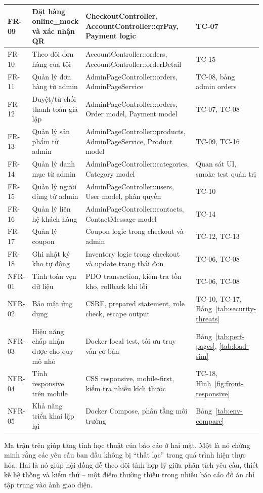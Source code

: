 \documentclass[11pt, a4paper]{article}
\begin{document}
\begin{longtable}{|p{1.2cm}|p{4.2cm}|p{3.6cm}|p{3.6cm}|}
    FR-09 & Đặt hàng online\_mock và xác nhận QR & CheckoutController, AccountController::qrPay, Payment logic & TC-07 \\ \hline
    FR-10 & Theo dõi đơn hàng của tôi & AccountController::orders, AccountController::orderDetail & TC-15 \\ \hline
    FR-11 & Quản lý đơn hàng từ admin & AdminPageController::orders, AdminPageService & TC-08, bảng admin orders \\ \hline
    FR-12 & Duyệt/từ chối thanh toán giả lập & AdminPageController::orders, Order model, Payment model & TC-07, TC-08 \\ \hline
    FR-13 & Quản lý sản phẩm từ admin & AdminPageController::products, AdminPageService, Product model & TC-09, TC-16 \\ \hline
    FR-14 & Quản lý danh mục từ admin & AdminPageController::categories, Category model & Quan sát UI, smoke test quản trị \\ \hline
    FR-15 & Quản lý người dùng từ admin & AdminPageController::users, User model, phân quyền & TC-10 \\ \hline
    FR-16 & Quản lý liên hệ khách hàng & AdminPageController::contacts, ContactMessage model & TC-14 \\ \hline
    FR-17 & Quản lý coupon & Coupon logic trong checkout và admin & TC-12, TC-13 \\ \hline
    FR-18 & Ghi nhật ký kho tự động & Inventory logic trong checkout và update trạng thái đơn & TC-06, TC-08 \\ \hline
    NFR-01 & Tính toàn vẹn dữ liệu & PDO transaction, kiểm tra tồn kho, rollback khi lỗi & TC-06, TC-08 \\ \hline
    NFR-02 & Bảo mật ứng dụng & CSRF, prepared statement, role check, escape output & TC-10, TC-17, Bảng~\ref{tab:security-threats} \\ \hline
    NFR-03 & Hiệu năng chấp nhận được cho quy mô nhỏ & Docker local test, tối ưu truy vấn cơ bản & Bảng~\ref{tab:perf-pages}, \ref{tab:load-sim} \\ \hline
    NFR-04 & Tính responsive trên mobile & CSS responsive, mobile-first, kiểm tra nhiều kích thước & TC-18, Hình~\ref{fig:front-responsive} \\ \hline
    NFR-05 & Khả năng triển khai lặp lại & Docker Compose, phân tầng môi trường & Bảng~\ref{tab:env-compare} \\ \hline
\end{longtable}
\endgroup

Ma trận trên giúp tăng tính học thuật của báo cáo ở hai mặt. Một là nó chứng minh
rằng các yêu cầu ban đầu không bị ``thất lạc'' trong quá trình hiện thực hóa. Hai là
nó giúp hội đồng dễ theo dõi tính hợp lý giữa phân tích yêu cầu, thiết kế hệ thống
và kiểm thử -- một điểm thường thiếu trong nhiều báo cáo đồ án chỉ tập trung vào ảnh giao diện.
\end{document}
